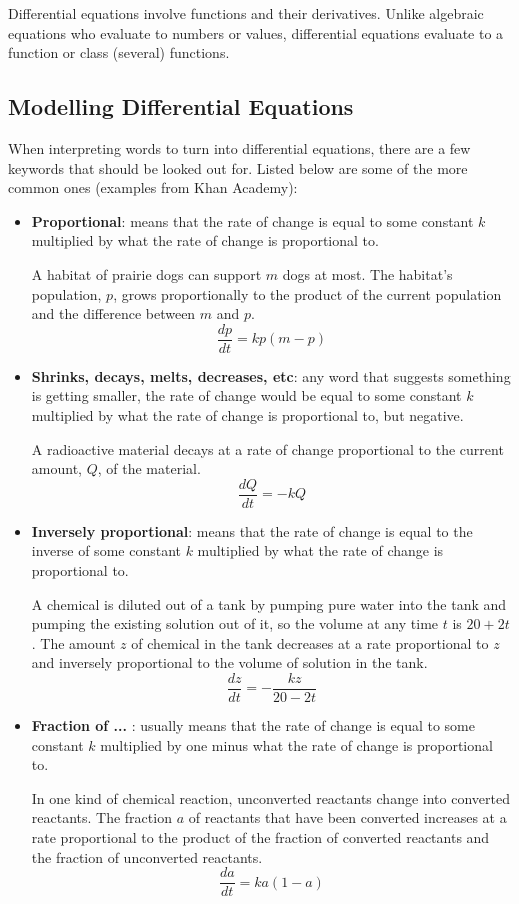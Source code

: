 \documentclass[12pt]{article}
\begin{document}
Differential equations involve functions and their derivatives. Unlike algebraic equations who evaluate to numbers or values, differential equations evaluate to a function or class (several) functions.

\subsection{Modelling Differential Equations}
When interpreting words to turn into differential equations, there are a few keywords that should be looked out for. Listed below are some of the more common ones (examples from Khan Academy):

\begin{itemize}
    \item \textbf{Proportional}: means that the rate of change is equal to some constant $k$ multiplied by what the rate of change is proportional to.
          \bigskip

          \noindent A habitat of prairie dogs can support $m$ dogs at most. The habitat's population, $p$, grows proportionally to the product of the current population and the difference between $m$ and $p$.
          \[ \frac{dp}{dt} = kp(m-p) \]

    \item \textbf{Shrinks, decays, melts, decreases, etc}: any word that suggests something is getting smaller, the rate of change would be equal to some constant $k$ multiplied by what the rate of change is proportional to, but negative.
          \bigskip

          \noindent A radioactive material decays at a rate of change proportional to the current amount, $Q$, of the material.
          \[ \frac{dQ}{dt} = -kQ \]

    \item \textbf{Inversely proportional}: means that the rate of change is equal to the inverse of some constant $k$ multiplied by what the rate of change is proportional to.
          \bigskip

          \noindent A chemical is diluted out of a tank by pumping pure water into the tank and pumping the existing solution out of it, so the volume at any time $t$ is $20+2t$. The amount $z$ of chemical in the tank decreases at a rate proportional to $z$ and inversely proportional to the volume of solution in the tank.
          \[ \frac{dz}{dt} = -\frac{kz}{20-2t} \]

    \item \textbf{Fraction of ... }: usually means that the rate of change is equal to some constant $k$ multiplied by one minus what the rate of change is proportional to.
          \bigskip

          \noindent In one kind of chemical reaction, unconverted reactants change into converted reactants. The fraction $a$ of reactants that have been converted increases at a rate proportional to the product of the fraction of converted reactants and the fraction of unconverted reactants.
          \[ \frac{da}{dt} = ka(1-a) \]
\end{itemize}
\end{document}
